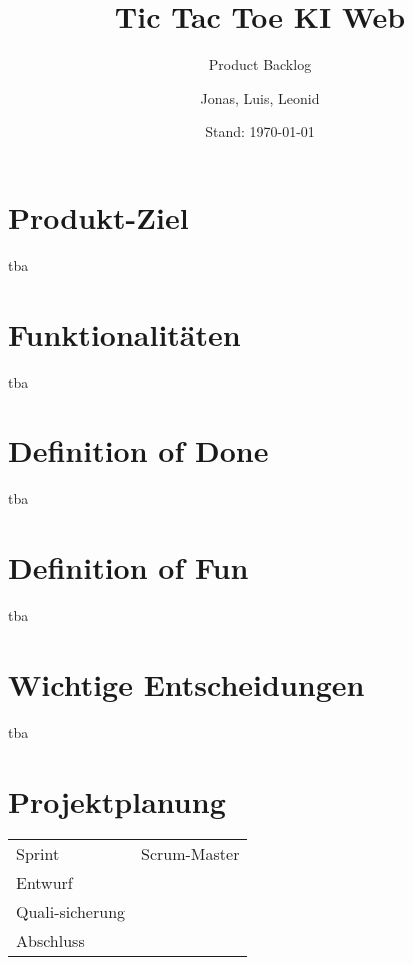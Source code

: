 \documentclass[titlepage]{scrartcl}
\title{Tic Tac Toe KI Web}
\subtitle{Product Backlog}
\date{Stand: \today}
\author{Jonas, Luis, Leonid}
\begin{document}
\maketitle

%

\section{Produkt-Ziel}%
tba
\section{Funktionalitäten}%
tba
\section{Definition of Done}%
tba
\section{Definition of Fun}%
tba
\section{Wichtige Entscheidungen}
tba
\section{Projektplanung}%
\begin{tabular}{lc}
	Sprint & Scrum-Master\\
	Entwurf & \\
	Quali-sicherung & \\
	Abschluss & \\
\end{tabular}
\end{document}
